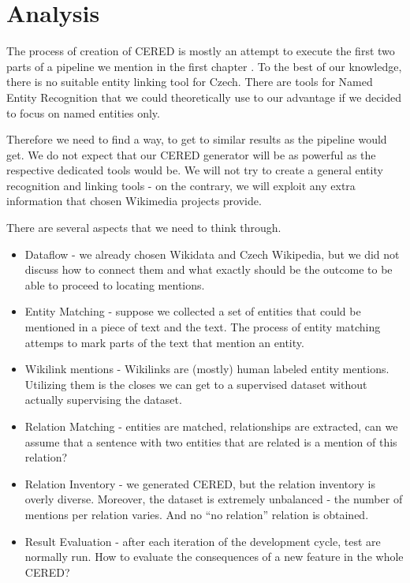 \section{Analysis}

The process of creation of CERED is mostly an attempt to execute the first two parts of a pipeline we mention in the first chapter . To the best of our knowledge, there is no suitable entity linking tool for Czech. There are tools for Named Entity Recognition that we could theoretically use to our advantage if we decided to focus on named entities only.

Therefore we need to find a way, to get to similar results as the pipeline would get. We do not expect that our CERED generator will be as powerful as the respective dedicated tools would be. We will not try to create a general entity recognition and linking tools - on the contrary, we will exploit any extra information that chosen Wikimedia projects provide.

There are several aspects that we need to think through.
\begin{itemize}
 \item  Dataflow - we already chosen Wikidata and Czech Wikipedia, but we did not discuss how to connect them and what exactly should be the outcome to be able to proceed to locating mentions.
 \item  Entity Matching - suppose we collected a set of entities that could be mentioned in a piece of text and the text. The process of entity matching attemps to mark parts of the text that mention an entity.
 \item  Wikilink mentions - Wikilinks are (mostly) human labeled entity mentions. Utilizing them is the closes we can get to a supervised dataset without actually supervising the dataset.
 \item  Relation Matching - entities are matched, relationships are extracted, can we assume that a sentence with two entities that are related is a mention of this relation? 
\item Relation Inventory - we generated CERED, but the relation inventory is overly diverse. Moreover, the dataset is extremely unbalanced - the number of mentions per relation varies. And no “no relation” relation is obtained.
 \item  Result Evaluation - after each iteration of the development cycle, test are normally run. How to evaluate the consequences of a new feature in the whole CERED?
\end{itemize}



